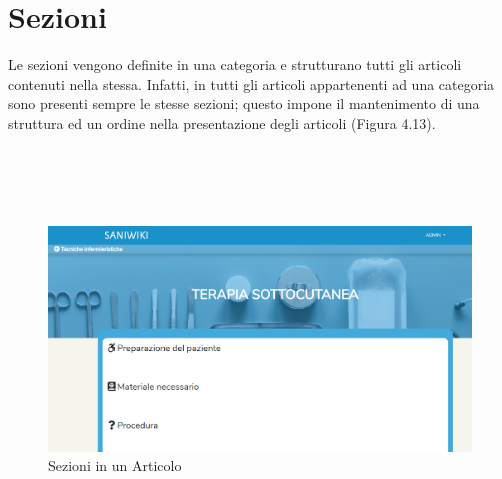 \documentclass[twoside]{supsistudent}
\begin{document}
\section{Sezioni}
Le sezioni vengono definite in una categoria e strutturano tutti gli articoli contenuti nella stessa. Infatti, in tutti gli articoli appartenenti ad una categoria sono presenti sempre le stesse sezioni; questo impone il mantenimento di una struttura ed un ordine nella presentazione degli articoli (Figura 4.13).\\\\\\\\\\
\begin{figure}[!h]
\centering
\includegraphics[scale=0.4]{saniwiki_sezioni.png}
\caption{Sezioni in un Articolo}
\end{figure}
\end{document}

